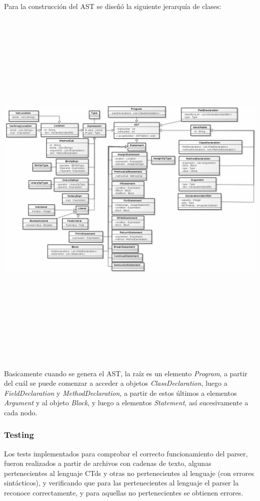 \documentclass[11pt,a4paper]{article}
\begin{document}
Para la construcción del AST se diseñó la siguiente jerarquía de clases:
\\
\begin{flushleft}
	\includegraphics[width=19.6cm,height=18cm]{ASTDiagram.png}
\end{flushleft}

Basicamente cuando se genera el AST, la raíz es un elemento \textit{Program}, a partir del cuál se puede comenzar a acceder a objetos \textit{ClassDeclaration}, luego a \textit{FieldDeclaration} y \textit{MethodDeclaration}, a partir de estos últimos a elementos \textit{Argument} y al objeto \textit{Block}, y luego a elementos \textit{Statement}, así sucesivamente a cada nodo.

\subsubsection{Testing}

Los tests implementados para comprobar el correcto funcionamiento del parser, fueron realizados a partir de archivos con cadenas de texto, algunas pertenecientes al lenguaje CTds y otras no pertenecientes al lenguaje (con errores sintácticos), y verificando que para las pertenecientes al lenguaje el parser la reconoce correctamente, y para aquellas no pertenecientes se obtienen errores. 
\end{document}
